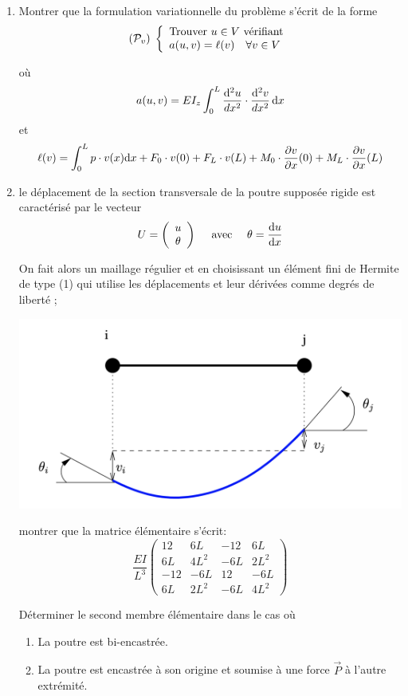 \documentclass{article}
\def \de {{\rm d}}
\begin{document}
\begin{enumerate}
\item Montrer que la formulation variationnelle du problème s'écrit de la forme
\[
({\cal P}_v)\;\left\{
\begin{array}{l}
\mbox{Trouver } u\in V \mbox{ vérifiant}\\
a(u,v)=\ell(v)\quad \forall v\in V
\end{array}
\right.
\]

où \[ a(u,v)=\displaystyle EI_z\int_0^L\frac{\de^2 u}{dx^2}\cdot \frac{\de^2 v}{dx^2}\,\de x\]
et \[ \ell(v)=\displaystyle \int_0^L p\cdot v(x)\de x+F_0 \cdot v(0)+F_L \cdot v(L)+M_0 \cdot \frac{\partial v}{\partial x}(0)+M_L \cdot \frac{\partial v}{\partial x}(L)\]
\item le déplacement de la section transversale de la poutre supposée rigide est caractérisé par le vecteur \[U=\left(\begin{array}{c}
u\\\theta
\end{array} \right)\quad \mbox{ avec }\quad \theta=\displaystyle \frac{\de u}{\de x}\]

On fait alors un maillage régulier et en choisissant un élément fini de Hermite de type (1) qui utilise les déplacements et leur dérivées comme degrés de liberté ;
\begin{center}
\includegraphics[scale=0.3]{poutreEnFlexion.png} 
\end{center}

 montrer que la matrice élémentaire s'écrit:
\[\frac{EI}{L^3}\left(\begin{array}{rrrr} 
12&6L&-12&6L\\
6L&4L^2&-6L&2L^2\\
-12&-6L&12&-6L\\
6L&2L^2&-6L&4L^2
\end{array}\right) 
\]

Déterminer le second membre élémentaire dans le cas où 
\begin{enumerate}
\item La poutre est bi-encastrée.
\item La poutre est encastrée à son origine et soumise à une force $\vec{P}$ à l'autre extrémité.
\end{enumerate}



\end{enumerate}
\end{document}
